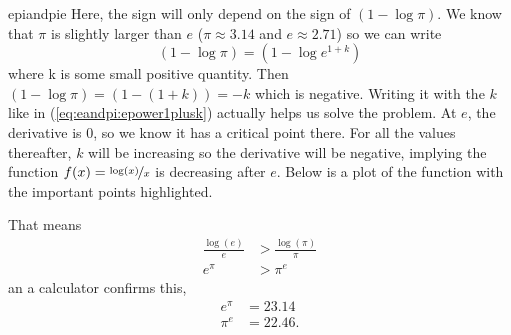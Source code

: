 \begin{answer}{epiandpie}
Here, the sign will only depend on the sign of
$(1 - \log \pi)$.
We know that $\pi$ is slightly larger than $e$
($\pi \approx 3.14$ and $e \approx 2.71$)
so we can write
\begin{equation}
\label{eq:eandpi:epower1plusk}
(1 - \log \pi)
=
(1 - \log e^{1 + k})
\end{equation}
where k is some small positive quantity.
Then
$(1 - \log \pi) =
(1 - (1 + k) ) = - k $ which is negative.
Writing it with the $k$ like in (\ref{eq:eandpi:epower1plusk}) actually helps us solve the problem.
At $e$, the derivative is 0, so we know it has a critical point there.
For all the values thereafter, $k$ will be increasing so the derivative will be negative, implying the function $f(x)=\nicefrac{\log(x)}{x}$ is decreasing after $e$.
Below is a plot of the function with the important points highlighted.
\begin{center}
\end{center}
That means
\begin{align*}
\frac{\log(e)}{e}
&>
\frac{\log(\pi)}{\pi}
\\
e^\pi
&>
\pi^e
\end{align*}
an a calculator confirms this,
\begin{align*}
e^\pi &= 23.14
\\
\pi^e &= 22.46
\text{.}
\end{align*}
\end{answer}
